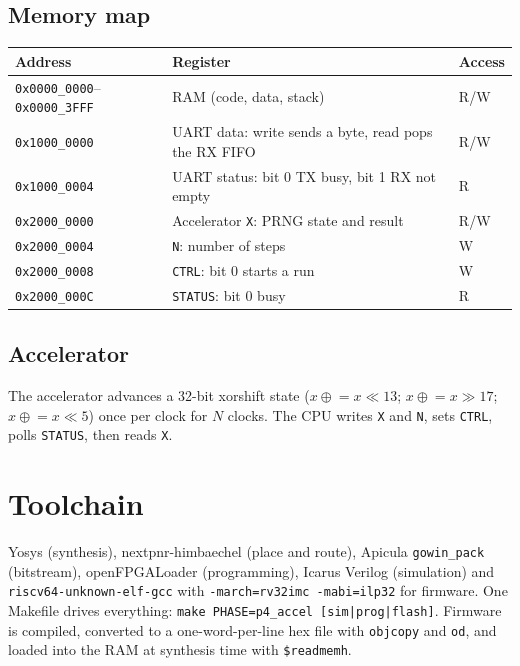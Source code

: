 \documentclass[11pt,a4paper]{article}
\begin{document}
\subsection{Memory map}
\begin{tabular}{@{}lll@{}}\toprule
Address & Register & Access\\\midrule
\texttt{0x0000\_0000}--\texttt{0x0000\_3FFF} & RAM (code, data, stack) & R/W\\
\texttt{0x1000\_0000} & UART data: write sends a byte, read pops the RX FIFO & R/W\\
\texttt{0x1000\_0004} & UART status: bit 0 TX busy, bit 1 RX not empty & R\\
\texttt{0x2000\_0000} & Accelerator \texttt{X}: PRNG state and result & R/W\\
\texttt{0x2000\_0004} & \texttt{N}: number of steps & W\\
\texttt{0x2000\_0008} & \texttt{CTRL}: bit 0 starts a run & W\\
\texttt{0x2000\_000C} & \texttt{STATUS}: bit 0 busy & R\\\bottomrule
\end{tabular}

\subsection{Accelerator}
The accelerator advances a 32-bit xorshift state ($x \mathrel{\oplus}= x\ll13$; $x \mathrel{\oplus}= x\gg17$; $x \mathrel{\oplus}= x\ll5$) once per clock for $N$ clocks.
The CPU writes \texttt{X} and \texttt{N}, sets \texttt{CTRL}, polls \texttt{STATUS}, then reads \texttt{X}.

\section{Toolchain}
Yosys (synthesis), nextpnr-himbaechel (place and route), Apicula \texttt{gowin\_pack} (bitstream), openFPGALoader (programming),
Icarus Verilog (simulation) and \texttt{riscv64-unknown-elf-gcc} with \texttt{-march=rv32imc -mabi=ilp32} for firmware.
One Makefile drives everything: \texttt{make PHASE=p4\_accel [sim|prog|flash]}.
Firmware is compiled, converted to a one-word-per-line hex file with \texttt{objcopy} and \texttt{od}, and loaded into the RAM at synthesis time with \texttt{\$readmemh}.
\end{document}
